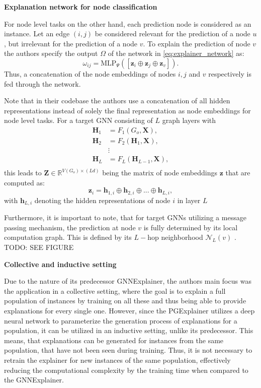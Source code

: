 \textbf{Explanation network for node classification}

For node level tasks on the other hand, each prediction node is considered as an instance. Let an edge $(i,j)$ be considered relevant for the prediction of a node $u$, but irrelevant for the prediction of a node $v$. To explain the prediction of node $v$ the authors specify the output $\Omega$ of the network in \ref{eq:explainer_network} as:
\begin{equation}
    \omega_{ij} = \text{MLP}_\Psi ([\mathbf{z}_i\oplus\mathbf{z}_j\oplus\mathbf{z}_v]).
\end{equation}
Thus, a concatenation of the node embeddings of nodes $i, j$ and $v$ respectively is fed through the network.

Note that in their codebase the authors use a concatenation of all hidden representations instead of solely the final representation as node embeddings for node level tasks.
For a target GNN consisting of $L$ graph layers with
\begin{align*}
    \mathbf{H}_1 &= F_1(G_o, \mathbf{X}), \\
    \mathbf{H}_2 &= F_2(\mathbf{H}_1, \mathbf{X}), \\
    &\vdots \\
    \mathbf{H}_L &= F_L(\mathbf{H}_{L-1}, \mathbf{X}), \\
\end{align*}
this leads to $\mathbf{Z} \in \mathbb{R}^{V(G_o)\times (Ld)}$ being the matrix of node embeddings $\mathbf{z}$ that are computed as:
\begin{equation}
    \mathbf{z}_i = \mathbf{h}_{1,i} \oplus \mathbf{h}_{2,i} \oplus ... \oplus \mathbf{h}_{L,i},
\end{equation}
with $\mathbf{h}_{L,i}$ denoting the hidden representations of node $i$ in layer $L$\bigskip

Furthermore, it is important to note, that for target GNNs utilizing a message passing mechanism, the prediction at node $v$ is fully determined by its local computation graph. This is defined by its $L-$hop neighborhood $\mathcal{N}_L(v)$ \cite{ying2019gnnexplainer}. TODO: SEE FIGURE\bigskip

\textbf{Collective and inductive setting}

Due to the nature of its predecessor GNNExplainer, the authors main focus was the application in a collective setting, where the goal is to explain a full population of instances by training on all these and thus being able to provide explanations for every single one. However, since the PGExplainer utilizes a deep neural network to parameterize the generation process of explanations for a population, it can be utilized in an inductive setting, unlike its predecessor. This means, that explanations can be generated for instances from the same population, that have not been seen during training. Thus, it is not necessary to retrain the explainer for new instances of the same population, effectively reducing the computational complexity by the training time when compared to the GNNExplainer.

